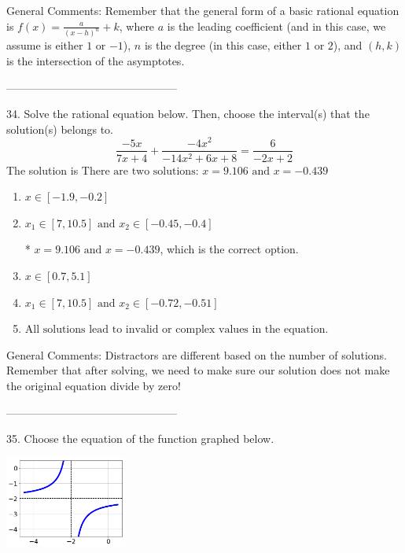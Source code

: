 \documentclass{article}[14pt]
\begin{document}
General Comments: Remember that the general form of a basic rational equation is $ f(x) = \frac{a}{(x-h)^n} + k$, where $a$ is the leading coefficient (and in this case, we assume is either $1$ or $-1$), $n$ is the degree (in this case, either $1$ or $2$), and $(h, k)$ is the intersection of the asymptotes.

-----------------------------------------------

34. Solve the rational equation below. Then, choose the interval(s) that the solution(s) belongs to.
$$ \frac{-5x}{7x + 4} + \frac{-4x^{2}}{-14x^{2} +6 x + 8} = \frac{6}{-2x + 2} $$ 
The solution is $ \text{There are two solutions: } x = 9.106 \text{ and } x = -0.439 $ 

\begin{enumerate}[label=\Alph*.] 
\item $ x \in [-1.9,-0.2] $ 

  
\item $ x_1 \in [7, 10.5] \text{ and } x_2 \in [-0.45,-0.4] $ 

 * $x = 9.106 \text{ and } x = -0.439$, which is the correct option. 
\item $ x \in [0.7,5.1] $ 

  
\item $ x_1 \in [7, 10.5] \text{ and } x_2 \in [-0.72,-0.51] $ 

  
\item $ \text{All solutions lead to invalid or complex values in the equation.} $ 

  
\end{enumerate} 
 
General Comments: Distractors are different based on the number of solutions. Remember that after solving, we need to make sure our solution does not make the original equation divide by zero!

-----------------------------------------------

35. Choose the equation of the function graphed below.
\begin{center} \includegraphics[width=0.3\textwidth]{../Figures/rationalGraphToEquationA.png} \end{center} 
\end{document}
